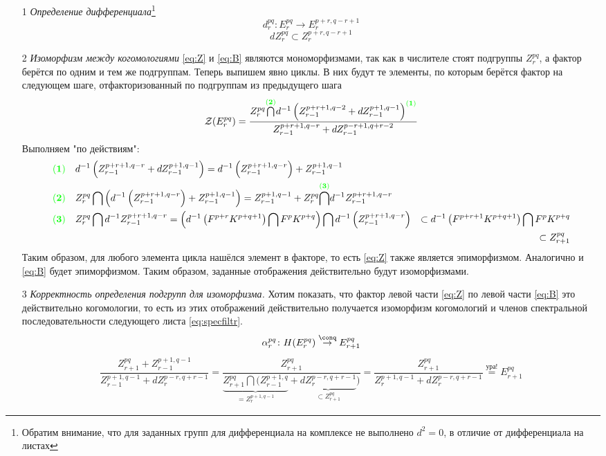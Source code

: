 \documentclass[../main.tex]{subfiles}
\begin{document}
\begin{itemize}
\item[1]\textit{Определение дифференциала}\footnote{Обратим внимание, что для заданных групп для дифференциала на комплексе не выполнено $d^2=0$, в отличие от дифференциала на листах }
\[d_r^{pq}\colon E_r^{pq} \to E_r^{p+r, q-r+1}\]
\[dZ_r^{pq}\subset Z_r^{p+r, q-r+1}\]
\item[2]\textit{Изоморфизм между когомологиями}
\ref{eq:Z} и \ref{eq:B} являются мономорфизмами, так как в числителе стоят подгруппы $Z^{pq}_r$, а фактор берётся по одним и тем же подгруппам. Теперь выпишем явно циклы. В них будут те элементы, по которым берётся фактор на следующем шаге, отфакторизованный по подгруппам из предыдущего шага 
\[
\mathcal{Z}(E^{pq}_r)=\dfrac{Z_r^{pq}\overset{{\color{green}\mathbf{(2)}}}{\bigcap} d^{-1}\left(Z_{r-1}^{p+r+1, q-2}+dZ_{r-1}^{p+1, q-1}\right)^{\color{green}\mathbf{(1)}}}{Z_{r-1}^{p+r+1, q-r} + dZ_{r-1}^{p-r+1, q+r-2}}
\]
Выполняем "по действиям":
\begin{align*}
{\color{green}\mathbf{(1)}}\quad& d^{-1}\left(Z_{r-1}^{p+r+1, q-r}+dZ_{r-1}^{p+1, q-1}\right) = d^{-1}\left(Z_{r-1}^{p+r+1, q-r}\right)+Z_{r-1}^{p+1, q-1}\\
{\color{green}\mathbf{(2)}} \quad& Z_r^{pq}\bigcap \left(d^{-1}\left(Z_{r-1}^{p+r+1, q-r}\right)+Z_{r-1}^{p+1, q-1}\right) = Z_{r-1}^{p+1, q-1}+Z_r^{pq}\overset{{\color{green}\mathbf{(3)}}}{\bigcap} d^{-1}Z_{r-1}^{p+r+1, q-r}\\
{\color{green}\mathbf{(3)}} \quad&Z_r^{pq}\bigcap d^{-1} Z_{r-1}^{p+r+1, q-r} = \left( d^{-1}\left(F^{p+r}K^{p+q+1}\right)\bigcap F^p K^{p+q} \right)\bigcap d^{-1}\left(Z_{r-1}^{p+r+1, q-r}\right)
  &\subset d^{-1}\left(F^{p+r+1}K^{p+q+1}\right)\bigcap F^pK^{p+q}\\
  &&\subset Z_{r+1}^{pq}
\end{align*}
Таким образом, для любого элемента цикла нашёлся элемент в факторе, то есть \ref{eq:Z} также является эпиморфизмом. Аналогично и \ref{eq:B} будет эпиморфизмом. Таким образом, заданные отображения действительно будут изоморфизмами.
\item[3]\textit{Корректность определения подгрупп для изоморфизма.}
Хотим показать, что фактор левой части \ref{eq:Z} по левой части \ref{eq:B} это действительно когомологии, то есть из этих отображений действительно получается изоморфизм когомологий и членов спектральной последовательности следующего листа \ref{eq:specfiltr}. 
\begin{align*}
\alpha_r^{pq}\colon H(E_r^{pq})\overset{\conq}{\to} E_{r+1}^{pq}
\end{align*}
\begin{align*}\label{eq:factorZpoB}
\dfrac{Z_{r+1}^{pq}+Z_{r-1}^{p+1, q-1}}{Z_{r-1}^{p+1, q-1}+dZ_{r}^{p-r, q+r-1}}= \dfrac{ Z_{r+1}^{pq} }
{\underset{ = Z_r^{p+1, q-1}}{\underbrace{ Z_{r+1}^{pq}\bigcap(Z_{r-1}^{p+1, q}} } +\underset{\subset Z_{r+1}^{pq}} {\underbrace{dZ_{r}^{p-r, q+r-1}}})} = \dfrac{Z_{r+1}^{pq}}{Z_r^{p+1, q-1}+dZ_r^{p-r, q+r-1}} \overset{\text{ура!}}{=}E_{r+1}^{pq}
\end{align*}
\end{itemize}
\end{document}
